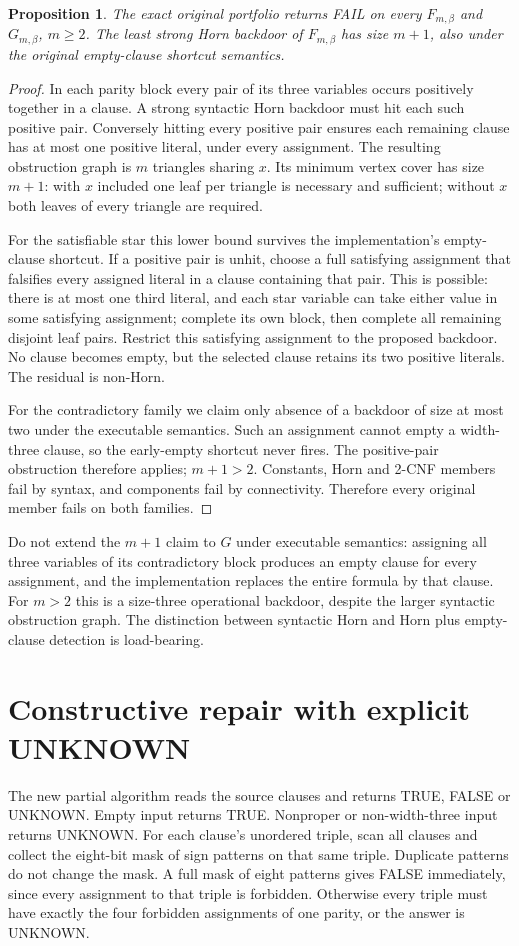 \documentclass[11pt]{article}
\newtheorem{proposition}{Proposition}
\begin{document}
\begin{proposition}
The exact original portfolio returns FAIL on every $F_{m,\beta}$ and $G_{m,\beta}$, $m\ge2$. The least strong Horn backdoor of $F_{m,\beta}$ has size $m+1$, also under the original empty-clause shortcut semantics.
\end{proposition}
\begin{proof}
In each parity block every pair of its three variables occurs positively together in a clause. A strong syntactic Horn backdoor must hit each such positive pair. Conversely hitting every positive pair ensures each remaining clause has at most one positive literal, under every assignment. The resulting obstruction graph is $m$ triangles sharing $x$. Its minimum vertex cover has size $m+1$: with $x$ included one leaf per triangle is necessary and sufficient; without $x$ both leaves of every triangle are required.

For the satisfiable star this lower bound survives the implementation's empty-clause shortcut. If a positive pair is unhit, choose a full satisfying assignment that falsifies every assigned literal in a clause containing that pair. This is possible: there is at most one third literal, and each star variable can take either value in some satisfying assignment; complete its own block, then complete all remaining disjoint leaf pairs. Restrict this satisfying assignment to the proposed backdoor. No clause becomes empty, but the selected clause retains its two positive literals. The residual is non-Horn.

For the contradictory family we claim only absence of a backdoor of size at most two under the executable semantics. Such an assignment cannot empty a width-three clause, so the early-empty shortcut never fires. The positive-pair obstruction therefore applies; $m+1>2$. Constants, Horn and 2-CNF members fail by syntax, and components fail by connectivity. Therefore every original member fails on both families.
\end{proof}
Do not extend the $m+1$ claim to $G$ under executable semantics: assigning all three variables of its contradictory block produces an empty clause for every assignment, and the implementation replaces the entire formula by that clause. For $m>2$ this is a size-three operational backdoor, despite the larger syntactic obstruction graph. The distinction between syntactic Horn and Horn plus empty-clause detection is load-bearing.

\section{Constructive repair with explicit UNKNOWN}
The new partial algorithm reads the source clauses and returns TRUE, FALSE or UNKNOWN. Empty input returns TRUE. Nonproper or non-width-three input returns UNKNOWN. For each clause's unordered triple, scan all clauses and collect the eight-bit mask of sign patterns on that same triple. Duplicate patterns do not change the mask. A full mask of eight patterns gives FALSE immediately, since every assignment to that triple is forbidden. Otherwise every triple must have exactly the four forbidden assignments of one parity, or the answer is UNKNOWN.
\end{document}

